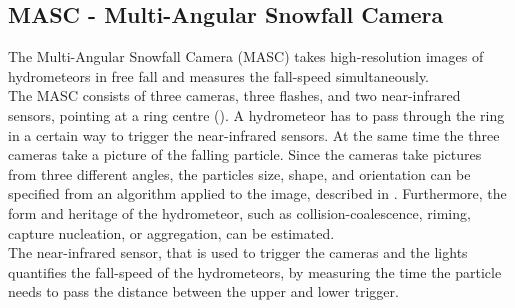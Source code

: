 \subsection{MASC - Multi-Angular Snowfall Camera}

The Multi-Angular Snowfall Camera (MASC) takes high-resolution images of hydrometeors in free fall and measures the fall-speed simultaneously. \\
The MASC consists of three cameras, three flashes, and two near-infrared sensors, pointing at a ring centre (). A hydrometeor has to pass through the ring in a certain way to trigger the near-infrared sensors. At the same time the three cameras take a picture of the falling particle. Since the cameras take pictures from three different angles, the particles size, shape, and orientation can be specified from an algorithm applied to the image, described in \citet{garrett_fall_2012}. Furthermore, the form and heritage of the hydrometeor, such as collision-coalescence, riming, capture nucleation, or aggregation, can be estimated. \\
The near-infrared sensor, that is used to trigger the cameras and the lights quantifies the fall-speed of the hydrometeors, by measuring the time the particle needs to pass the distance between the upper and lower trigger.    
